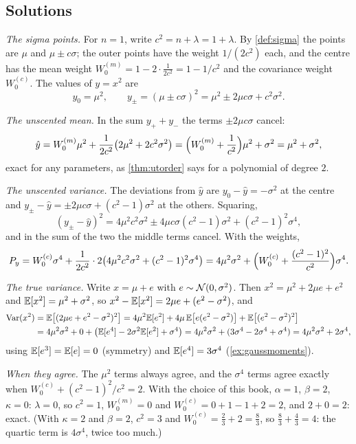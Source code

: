 \subsection*{Solutions}

 \emph{The sigma points.} For $n=1$, write $c^2=n+\lambda
=1+\lambda$. By \cref{def:sigma} the points are $\mu$ and $\mu\pm c\sigma$;
the outer points have the weight $1/(2c^2)$ each, and the centre has the
mean weight $W^{(m)}_0=1-2\cdot\frac1{2c^2}=1-1/c^2$ and the covariance
weight $W^{(c)}_0$. The values of $y=x^2$ are
\[
  y_0=\mu^2,\qquad y_\pm=(\mu\pm c\sigma)^2=\mu^2\pm2\mu c\sigma+c^2\sigma^2 .
\]

\emph{The unscented mean.} In the sum $y_++y_-$ the terms $\pm2\mu c\sigma$
cancel:
\[
  \hat y=W^{(m)}_0\mu^2+\frac1{2c^2}\bigl(2\mu^2+2c^2\sigma^2\bigr)
  =\Bigl(W^{(m)}_0+\frac1{c^2}\Bigr)\mu^2+\sigma^2=\mu^2+\sigma^2 ,
\]
exact for any parameters, as \cref{thm:utorder} says for a polynomial of
degree $2$.

\emph{The unscented variance.} The deviations from $\hat y$ are
$y_0-\hat y=-\sigma^2$ at the centre and
$y_\pm-\hat y=\pm2\mu c\sigma+(c^2-1)\sigma^2$ at the others. Squaring,
\[
  (y_\pm-\hat y)^2=4\mu^2c^2\sigma^2\pm4\mu c\sigma(c^2-1)\sigma^2
  +(c^2-1)^2\sigma^4 ,
\]
and in the sum of the two the middle terms cancel. With the weights,
\[
  P_y=W^{(c)}_0\sigma^4+\frac1{2c^2}\cdot2\bigl(4\mu^2c^2\sigma^2
  +(c^2-1)^2\sigma^4\bigr)
  =4\mu^2\sigma^2+\Bigl(W^{(c)}_0+\frac{(c^2-1)^2}{c^2}\Bigr)\sigma^4.
\]

\emph{The true variance.} Write $x=\mu+e$ with $e\sim\mathcal{N}(0,\sigma^2)$.
Then $x^2=\mu^2+2\mu e+e^2$ and $\mathbb{E}[x^2]=\mu^2+\sigma^2$, so
$x^2-\mathbb{E}[x^2]=2\mu e+(e^2-\sigma^2)$, and
\begin{align*}
  \operatorname{Var}(x^2)&=\mathbb{E}\bigl[(2\mu e+e^2-\sigma^2)^2\bigr]
  =4\mu^2\mathbb{E}[e^2]+4\mu\,\mathbb{E}\bigl[e(e^2-\sigma^2)\bigr]
   +\mathbb{E}\bigl[(e^2-\sigma^2)^2\bigr]\\
  &=4\mu^2\sigma^2+0+\bigl(\mathbb{E}[e^4]-2\sigma^2\mathbb{E}[e^2]+\sigma^4\bigr)
  =4\mu^2\sigma^2+(3\sigma^4-2\sigma^4+\sigma^4)
  =4\mu^2\sigma^2+2\sigma^4,
\end{align*}
using $\mathbb{E}[e^3]=\mathbb{E}[e]=0$ (symmetry) and $\mathbb{E}[e^4]=3\sigma^4$
(\cref{ex:gaussmoments}).

\emph{When they agree.} The $\mu^2$ terms always agree, and the
$\sigma^4$ terms agree exactly when $W^{(c)}_0+(c^2-1)^2/c^2=2$. With the
choice of this book, $\alpha=1$, $\beta=2$, $\kappa=0$: $\lambda=0$, so
$c^2=1$, $W^{(m)}_0=0$ and $W^{(c)}_0=0+1-1+2=2$, and
$2+0=2$: exact. (With $\kappa=2$ and $\beta=2$, $c^2=3$ and
$W^{(c)}_0=\frac23+2=\frac83$, so $\frac83+\frac43=4$: the quartic term
is $4\sigma^4$, twice too much.)

